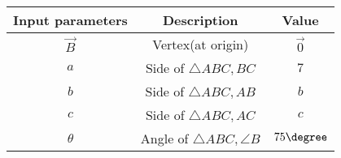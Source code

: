   \begin{tabular}{|c|c|c|}
    \hline
    \textbf{Input parameters}&\textbf{Description}&\textbf{Value}\\
    \hline
    $\Vec{B}$&Vertex(at origin)&$\Vec{0}$ \\
    \hline
    $a$&Side of $\triangle ABC,BC$&$7$ \\
    \hline
    $b$&Side of $\triangle ABC,AB$&$b$ \\
    \hline
    $c$&Side of $\triangle ABC,AC$&$c$ \\
    \hline
    $\theta$&Angle of $\triangle ABC,\angle B$&$75\degree$ \\
   \hline
    \end{tabular}
